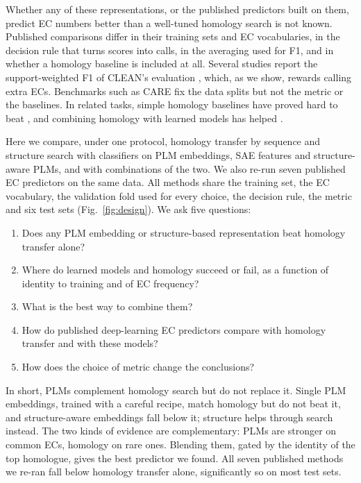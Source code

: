 \documentclass[11pt]{article}
\begin{document}
Whether any of these representations, or the published predictors built on them, predict EC numbers better than a
well-tuned homology search is not known.
Published comparisons differ in their training sets and EC vocabularies, in the decision rule that turns scores into
calls, in the averaging used for F1, and in whether a homology baseline is included at all. Several studies report the
support-weighted F1 of CLEAN's evaluation \cite{clean,milbc}, which, as we show, rewards calling extra ECs.
Benchmarks such as CARE \cite{care} fix the data splits but not the metric or the baselines. In related tasks,
simple homology baselines have proved hard to beat \cite{radivojac2013,zhou2019cafa}, and combining homology with
learned models has helped \cite{deepgoplus}.

Here we compare, under one protocol, homology transfer by sequence and structure search with classifiers on PLM
embeddings, SAE features and structure-aware PLMs, and with combinations of the two. We also re-run seven published EC
predictors on the same data. All methods share the training set, the EC vocabulary, the validation fold used for every
choice, the decision rule, the metric and six test sets (Fig.~\ref{fig:design}). We ask five questions:
\begin{enumerate}
  \item Does any PLM embedding or structure-based representation beat homology transfer alone?
  \item Where do learned models and homology succeed or fail, as a function of identity to training and of EC
        frequency?
  \item What is the best way to combine them?
  \item How do published deep-learning EC predictors compare with homology transfer and with these models?
  \item How does the choice of metric change the conclusions?
\end{enumerate}
In short, PLMs complement homology search but do not replace it. Single PLM embeddings, trained with a careful
recipe, match homology but do not beat it, and
structure-aware embeddings fall below it; structure helps through search instead. The two kinds of evidence are
complementary: PLMs are stronger on common ECs, homology on rare ones. Blending them, gated by the identity of the top
homologue, gives the best predictor we found. All seven published methods we re-ran fall below homology transfer
alone, significantly so on most test sets.
\end{document}
